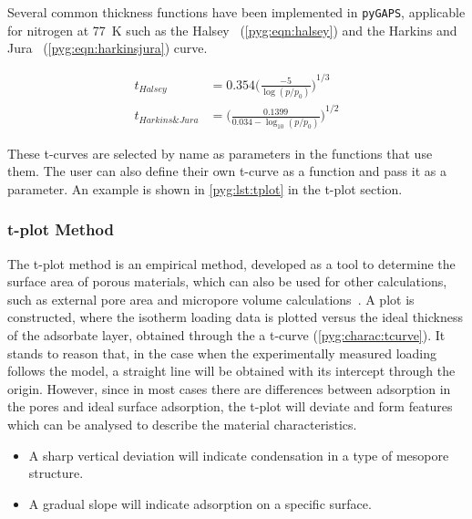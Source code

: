 Several common thickness functions have been implemented in \texttt{pyGAPS},
applicable for nitrogen at \SI{77}{\kelvin}
such as the Halsey~\cite{halseyPhysicalAdsorptionNon1948}
(\autoref{pyg:eqn:halsey}) and the
Harkins and Jura~\cite{harkinsSurfacesSolidsXIII1944}
(\autoref{pyg:eqn:harkinsjura}) curve.

\begin{align}
	t_{Halsey}        & = 0.354 {\Big(\frac{-5}{\log(p/p_0)}\Big)}^{1/3} \label{pyg:eqn:halsey}                 \\
	t_{Harkins\&Jura} & = {\Big(\frac{0.1399}{0.034 - \log_{10}(p/p_0)}\Big)}^{1/2} \label{pyg:eqn:harkinsjura}
\end{align}

These t-curves are selected by name as parameters in
the functions that use them. The user can also define their
own t-curve as a function and pass it as a parameter. An example
is shown in \autoref{pyg:lst:tplot} in the t-plot section.

\subsubsection{t-plot Method}\label{pyg:charac:tplot}

The t-plot method is an empirical method, developed as a
tool to determine the surface area of porous materials,
which can also be used for other calculations, such as
external pore area and micropore volume
calculations~\cite{lippensStudiesPoreSystems1965}.
A plot is constructed, where the isotherm loading
data is plotted versus the ideal thickness of the adsorbate layer,
obtained through the a t-curve (\autoref{pyg:charac:tcurve}).
It stands to reason that, in the case when the experimentally measured
loading follows the model, a straight line will be obtained with its
intercept through the origin. However, since in most cases there
are differences between adsorption in the pores and ideal surface
adsorption, the t-plot will deviate and form features which can
be analysed to describe the material characteristics.

\begin{itemize}

	\item A sharp vertical deviation will indicate condensation
	      in a type of mesopore structure.
	\item A gradual slope will indicate adsorption on a specific
	      surface.

\end{itemize}

